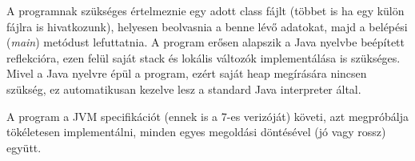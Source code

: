 A programnak szükséges értelmeznie egy adott class fájlt (többet is ha egy külön fájlra is hivatkozunk), helyesen beolvasnia a benne lévő adatokat, majd a belépési (\textit{main}) metódust lefuttatnia. A program erősen alapszik a Java nyelvbe beépített reflekcióra, ezen felül saját stack és lokális változók implementálása is szükséges. Mivel a Java nyelvre épül a program, ezért saját heap megírására nincsen szükség, ez automatikusan kezelve lesz a standard Java interpreter által.

A program a JVM specifikációt\cite{jvmspecification} (ennek is a 7-es verizóját) követi, azt megpróbálja tökéletesen implementálni, minden egyes megoldási döntésével (jó vagy rossz) együtt.